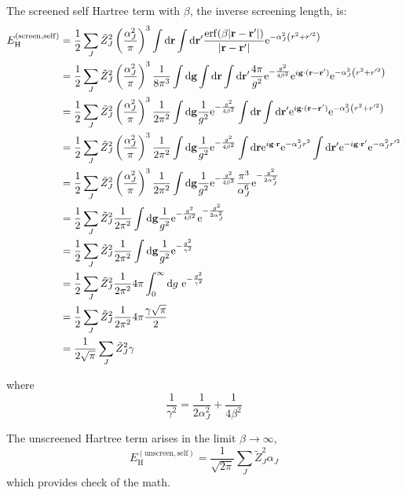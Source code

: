 \documentclass[paper=a4, fontsize=11pt]{article} %
\numberwithin{equation}{section} %
\numberwithin{figure}{section} %
\numberwithin{table}{section} %
\newcommand{\bg}{{\bf{g}}}
\newcommand{\br}{{\bf{r}}}
\newcommand{\re}{{\mathrm{e}}}
\newcommand{\rerf}{{\mathrm{erf}}}
\newcommand{\rd}{{\mathrm{d}}}
\newcommand{\rH}{{\mathrm{H}}}
\newcommand{\al}{{\alpha}}
\begin{document}
The screened self Hartree term with $\beta$, the inverse screening length, is:
\begin{equation}
\begin{split}
E_{\rH}^{(\mathrm{screen,self})} 
&= \frac{1}{2}\sum_J \tilde Z_J^2 \left(\frac{\al_J^2}{\pi}\right)^3 \int \rd \br \int \rd \br'  \frac{\rerf(\beta|\br - \br'|)}{|\br-\br'|}\re^{-\al_J^2 \left(r^2+r'^2\right)}\\
&= \frac{1}{2}\sum_J \tilde Z_J^2 \left(\frac{\al_J^2}{\pi}\right)^3 \frac{1}{8\pi^3}\int \rd \bg \int \rd \br \int \rd \br'  \frac{4\pi}{g^2} \re^{-\frac{g^2}{4\beta^2}} \re^{i\bg\cdot(\br - \br')}\re^{-\al_J^2 \left(r^2+r'^2\right)}\\
&= \frac{1}{2}\sum_J \tilde Z_J^2 \left(\frac{\al_J^2}{\pi}\right)^3 \frac{1}{2\pi^2}\int \rd \bg \frac{1}{g^2} \re^{-\frac{g^2}{4\beta^2}}  \int \rd \br \int \rd \br'  \re^{i\bg\cdot(\br - \br')}\re^{-\al_J^2 \left(r^2+r'^2\right)}\\
&= \frac{1}{2}\sum_J \tilde Z_J^2 \left(\frac{\al_J^2}{\pi}\right)^3 \frac{1}{2\pi^2}\int \rd \bg \frac{1}{g^2} \re^{-\frac{g^2}{4\beta^2}}  \int \rd \br  \re^{i\bg\cdot\br}\re^{-\al_J^2 r^2} \int \rd \br'  \re^{-i\bg\cdot\br'}\re^{-\al_J^2 r'^2}\\
&= \frac{1}{2}\sum_J \tilde Z_J^2 \left(\frac{\al_J^2}{\pi}\right)^3 \frac{1}{2\pi^2}\int \rd \bg \frac{1}{g^2} \re^{-\frac{g^2}{4\beta^2}}  \frac{\pi^3}{\al_J^6} \re^{-\frac{g^2}{2\al_J^2}}\\
&= \frac{1}{2}\sum_J \tilde Z_J^2 \frac{1 }{2\pi^2}\int \rd \bg \frac{1}{g^2} \re^{-\frac{g^2}{4\beta^2}} \re^{-\frac{g^2}{2\al_J^2}}\\
&= \frac{1}{2}\sum_J \tilde Z_J^2 \frac{1 }{2\pi^2}\int \rd \bg \frac{1}{g^2} \re^{-\frac{g^2}{\gamma^2}} \\
&= \frac{1}{2}\sum_J \tilde Z_J^2 \frac{1 }{2\pi^2}4\pi \int_0^\infty \rd g\ \re^{-\frac{g^2}{\gamma^2}}\\
&= \frac{1}{2}\sum_J \tilde Z_J^2 \frac{1 }{2\pi^2}4\pi \frac{\gamma\sqrt{\pi}}{2}\\
&= \frac{1}{2\sqrt{\pi}}\sum_J \tilde Z_J^2 \gamma
\end{split}
\end{equation}

where
\begin{equation}
\frac{1}{\gamma^2} = \frac{1}{2\al_J^2} + \frac{1}{4\beta^2}
\end{equation}

The unscreened Hartree term arises in the limit $\beta \rightarrow \infty$,
\begin{equation}
E_{\rH}^{(\mathrm{unscreen,self})} 
= \frac{1}{\sqrt{2\pi}}\sum_J \tilde Z_J^2 \al_J
\end{equation}
which provides check of the math.
\end{document}

